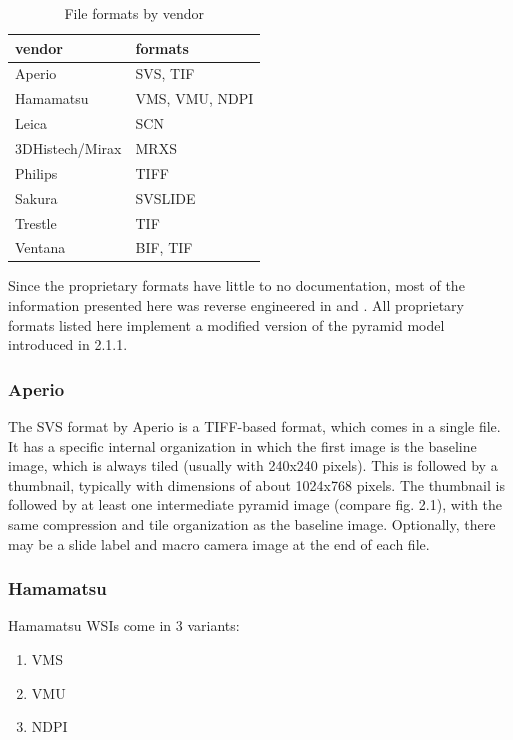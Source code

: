\begin{table}[H]
	\begin{center}
		\begin{tabular}{| l | l |}
			\hline
			\textbf{vendor} & \textbf{formats}\\ \hline
			Aperio & SVS, TIF\\ \hline
			Hamamatsu & VMS, VMU, NDPI\\ \hline
			Leica & SCN\\ \hline
			3DHistech/Mirax & MRXS\\ \hline
			Philips & TIFF\\ \hline
			Sakura & SVSLIDE\\ \hline
			Trestle & TIF\\ \hline
			Ventana & BIF, TIF\\ \hline
		\end{tabular}
		\caption{File formats by vendor}
	\end{center}
\end{table}

Since the proprietary formats have little to no documentation, most of the information presented here was reverse engineered in \cite{Goode13} and \cite{web:openslide}. All proprietary formats listed here implement a modified version of the pyramid model introduced in 2.1.1.


\subsubsection{Aperio}
The SVS format by Aperio is a TIFF-based format, which comes in a single file\cite{Goode13}. It has a specific internal organization in which the first image is the baseline image, which is always tiled (usually with 240x240 pixels). This is followed by a thumbnail, typically with dimensions of about 1024x768 pixels. The thumbnail is followed by at least one intermediate pyramid image (compare fig. 2.1), with the same compression and tile organization as the baseline image\cite{web:openslide}. Optionally, there may be a slide label and macro camera image at the end of each file\cite{web:openslide}.


\subsubsection{Hamamatsu}
Hamamatsu WSIs come in 3 variants:
\begin{enumerate}[(1)]
	\item VMS
	\item VMU
	\item NDPI
\end{enumerate}

